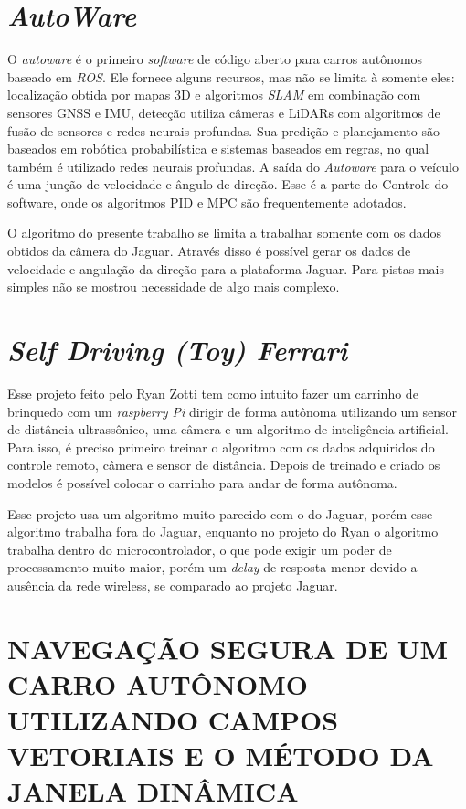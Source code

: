 \section{\textit{AutoWare}}

O \textit{autoware} é o primeiro \textit{software} de código aberto para carros autônomos baseado em \textit{ROS}. Ele fornece alguns recursos, mas não se limita à somente eles: localização obtida por mapas 3D e algoritmos \textit{SLAM} em combinação com sensores GNSS e IMU, detecção utiliza câmeras e LiDARs com algoritmos de fusão de sensores e redes neurais profundas. Sua predição e planejamento são baseados em robótica probabilística e sistemas baseados em regras, no qual também é utilizado redes neurais profundas. A saída do \textit{Autoware} para o veículo é uma junção de velocidade e ângulo de direção. Esse é a parte do Controle do software, onde os algoritmos PID e MPC são frequentemente adotados. \cite{autoware}

O algoritmo do presente trabalho se limita a trabalhar somente com os dados obtidos da câmera do Jaguar. Através disso é possível gerar os dados de velocidade e angulação da direção para a plataforma Jaguar. Para pistas mais simples não se mostrou necessidade de algo mais complexo.

\section{\textit{Self Driving (Toy) Ferrari}}
\label{Self_Driving_(Toy)_Ferrari}

Esse projeto feito pelo Ryan Zotti tem como intuito fazer um carrinho de brinquedo com um \textit{raspberry Pi} dirigir de forma autônoma utilizando um sensor de distância ultrassônico, uma câmera e um algoritmo de inteligência artificial. Para isso, é preciso primeiro treinar o algoritmo com os dados adquiridos do controle remoto, câmera e sensor de distância. Depois de treinado e criado os modelos é possível colocar o carrinho para andar de forma autônoma. \cite{selfdrivingcartoy}

Esse projeto usa um algoritmo muito parecido com o do Jaguar, porém esse algoritmo trabalha fora do Jaguar, enquanto no projeto do Ryan o algoritmo trabalha dentro do microcontrolador, o que pode exigir um poder de processamento muito maior, porém um \textit{delay} de resposta menor devido a ausência da rede wireless, se comparado ao projeto Jaguar.

\section{NAVEGAÇÃO SEGURA DE UM CARRO AUTÔNOMO UTILIZANDO CAMPOS VETORIAIS E O MÉTODO DA JANELA DINÂMICA}
\label{NAVEGAÇÃO_SEGURA}

